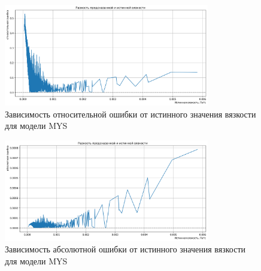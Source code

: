 \documentclass[a4paper,12pt]{article}
\begin{document}
    \begin{figure}[ht!]
        \centering
        \includegraphics[width=0.8\textwidth]{MYS_percent.png}
        \caption{Зависимость относительной ошибки от истинного значения вязкости для модели MYS}
        \label{fig:mys_rmse}
    \end{figure}
    
    \begin{figure}[ht!]
        \centering
        \includegraphics[width=0.8\textwidth]{MYS_rmse.png}
        \caption{Зависимость абсолютной ошибки от истинного значения вязкости для модели MYS}
        \label{fig:mys_relative_error}
    \end{figure}
    
\end{document}

